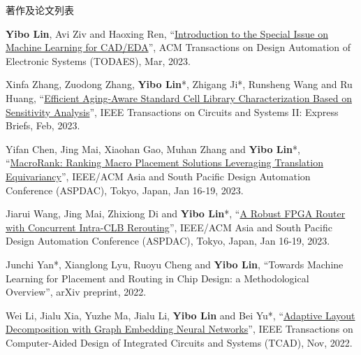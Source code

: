 \begin{rSection}{著作及论文列表}
\begin{description}[font=\normalfont, rightmargin=2em]
\item[{[J110]}]{
        \textbf{Yibo Lin}, Avi Ziv and Haoxing Ren, 
    ``\href{https://doi.org/10.1145/3586208}{Introduction to the Special Issue on Machine Learning for CAD/EDA}'', 
    ACM Transactions on Design Automation of Electronic Systems (TODAES), Mar, 2023.
    
}
            

\item[{[J109]}]{
        Xinfa Zhang, Zuodong Zhang, \textbf{Yibo Lin}*, Zhigang Ji*, Runsheng Wang and Ru Huang, 
    ``\href{https://doi.org/10.1109/TCSII.2022.3212123}{Efficient Aging-Aware Standard Cell Library Characterization Based on Sensitivity Analysis}'', 
    IEEE Transactions on Circuits and Systems II: Express Briefs, Feb, 2023.
    
}
            

\item[{[C108]}]{
        Yifan Chen, Jing Mai, Xiaohan Gao, Muhan Zhang and \textbf{Yibo Lin}*, 
    ``\href{https://doi.org/10.1145/3566097.3567899}{MacroRank: Ranking Macro Placement Solutions Leveraging Translation Equivariancy}'', 
    IEEE/ACM Asia and South Pacific Design Automation Conference (ASPDAC), Tokyo, Japan, Jan 16-19, 2023.
    
}
            

\item[{[C107]}]{
        Jiarui Wang, Jing Mai, Zhixiong Di and \textbf{Yibo Lin}*, 
    ``\href{https://doi.org/10.1145/3566097.3567898}{A Robust FPGA Router with Concurrent Intra-CLB Rerouting}'', 
    IEEE/ACM Asia and South Pacific Design Automation Conference (ASPDAC), Tokyo, Japan, Jan 16-19, 2023.
    
}
            

\item[{[J106]}]{
        Junchi Yan*, Xianglong Lyu, Ruoyu Cheng and \textbf{Yibo Lin}, 
    ``Towards Machine Learning for Placement and Routing in Chip Design: a Methodological Overview'', 
    arXiv preprint, 2022.
    
}
            

\item[{[J105]}]{
        Wei Li, Jialu Xia, Yuzhe Ma, Jialu Li, \textbf{Yibo Lin} and Bei Yu*, 
    ``\href{https://doi.org/10.1109/TCAD.2022.3140729}{Adaptive Layout Decomposition with Graph Embedding Neural Networks}'', 
    IEEE Transactions on Computer-Aided Design of Integrated Circuits and Systems (TCAD), Nov, 2022.
    
}
            


\end{description}
\end{rSection}
